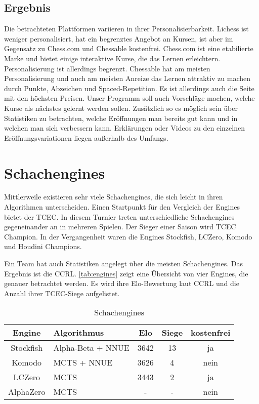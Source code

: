\subsection{Ergebnis}
Die betrachteten Plattformen variieren in ihrer Personalisierbarkeit. Lichess ist weniger personalisiert, hat ein begrenztes Angebot an Kursen, ist aber im Gegensatz zu Chess.com und Chessable kostenfrei. Chess.com ist eine etabilierte Marke und bietet einige interaktive Kurse, die das Lernen erleichtern. Personalisierung ist allerdings begrenzt. Chessable hat am meisten Personalisierung und auch am meisten Anreize das Lernen attraktiv zu machen durch Punkte, Abzeichen und Spaced-Repetition. Es ist allerdings auch die Seite mit den höchsten Preisen. Unser Programm soll auch Vorschläge machen, welche Kurse als nächstes gelernt werden sollen. Zusätzlich so es  möglich sein über Statistiken zu betrachten, welche Eröffnungen man bereits gut kann und in welchen man sich verbessern kann. Erklärungen oder Videos zu den einzelnen Eröffnungsvariationen liegen außerhalb des Umfangs.


\section{Schachengines}
Mittlerweile existieren sehr viele Schachengines, die sich leicht in ihren Algorithmen unterscheiden. Einen Startpunkt für den Vergleich der Engines bietet der \ac{TCEC}. In diesem Turnier treten unterschiedliche Schachengines gegeneinander an in mehreren Spielen. Der Sieger einer Saison wird  \ac{TCEC} Champion. In der Vergangenheit waren die Engines Stockfish, LCZero, Komodo und Houdini Champions. \cite{tcec_chessdom_tcec-chess_2025}

Ein Team hat auch Statistiken angelegt über die meisten Schachengines. Das Ergebnis ist die \acf{CCRL}. \cite{ccrl_team_ccrl_2025} \autoref{tab:engines} zeigt eine Übersicht von vier Engines, die genauer betrachtet werden. Es wird ihre Elo-Bewertung laut \ac{CCRL} und die Anzahl ihrer \ac{TCEC}-Siege aufgelistet.

\begin{table}[h]
    \centering
    \begin{tabular}{|c|l|c|c|c|}
        \hline
        Engine & Algorithmus & Elo & Siege & kostenfrei \\
        \hline
        Stockfish & Alpha-Beta + \acs{NNUE} & 3642 & 13 & ja \\
        \hline
        Komodo & \acs{MCTS} + \acs{NNUE} & 3626 & 4 & nein \\
        \hline
        LCZero & \acs{MCTS} & 3443 & 2 & ja \\
        \hline
        AlphaZero & \acs{MCTS} & - & - & nein \\
        \hline
    \end{tabular}
    \caption{Schachengines}
    \label{tab:engines}
\end{table}

